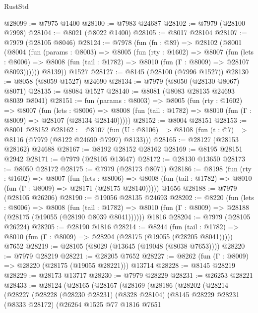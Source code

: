 \begin{lexlean}{RustStd}
\begin{coremodule}
@28099 := @7975 @1400
@28100 := @7983 @24687
@28102 := @7979 (@28100 @7998)
@28104 := @8021 (@8022 @1400)
@28105 := @8017 @28104
@28107 := @7979 (@28105 @8046)
@28124 := @7978
    (fun (fn : @89) =>
    @28102
      (@8001
        (@8004
          (fun (params : @8003) =>
          @8005
            (fun (rty : @1602) =>
            @8007
              (fun (lets : @8006) =>
              @8008 (fun (tail : @1782) => @8010 (fun (Γ : @8009) => @28107 @8093))))))
        @8139))
    @1527
@28127 := @8145 (@28100 (@7996 @1527))
@28130 := @8058 (@8059 @1527) @24690
@28134 := @7979 (@8050 (@28130 @8067) @8071)
@28135 := @8084 @1527
@28140 := @8081 (@8083 @28135 @24693 @8039 @8041)
@28151 := fun (params : @8003) =>
  @8005
    (fun (rty : @1602) =>
    @8007
      (fun (lets : @8006) =>
      @8008 (fun (tail : @1782) => @8010 (fun (Γ : @8009) => @28107 (@28134 @28140)))))
@28152 := @8004 @28151
@28153 := @8001 @28152
@28162 := @8107
    (fun (U : @8106) => @8108 (fun (t : @7) => @8116 (@7979 (@8122 @24690 @7997) @8133)))
@28165 := @28127 (@28153 @28162) @24688
@28167 := @8192 @28152 @28162
@28169 := @8195 @28151 @2942
@28171 := @7979 (@28105 @13647)
@28172 := @28130 @13650
@28173 := @8050 @28172
@28175 := @7979 (@28173 @8071)
@28186 := @8198
    (fun (rty : @1602) =>
    @8007
      (fun (lets : @8006) =>
      @8008 (fun (tail : @1782) => @8010 (fun (Γ : @8009) => @28171 (@28175 @28140)))))
    @1656
@28188 := @7979 (@28105 @26206)
@28190 := @19056 @28135 @24693
@28202 := @8220
    (fun (lets : @8006) =>
    @8008
      (fun (tail : @1782) =>
      @8010 (fun (Γ : @8009) => @28188 (@28175 (@19055 (@28190 @8039 @8041))))))
    @1816
@28204 := @7979 (@28105 @26224)
@28205 := @28190 @1816
@28214 := @8244
    (fun (tail : @1782) => @8010 (fun (Γ : @8009) => @28204 (@28175 (@19055 (@28205 @8041)))))
    @7652
@28219 := @28105 (@8029 (@13645 (@19048 (@8038 @7653))))
@28220 := @7979 @28219
@28221 := @28205 @7652
@28227 := @8262 (fun (Γ : @8009) => @28220 (@28175 (@19055 @28221))) @13714
@28228 := @8145 @28219
@28229 := @28173 @13717
@28230 := @7979 @28229
@28231 := @26253 @28221
@28433 := @28124
    (@28165
      (@28167
        (@28169
          (@28186
            (@28202
              (@28214
                (@28227
                  (@28228
                    (@28230 @28231)
                    (@8328 @28104)
                    (@8145
                      @28229
                      @28231
                      (@8333 @28172)
                      (@26264
                        @1525
                        @77
                        @1816
                        @7651

\end{coremodule}
\end{lexlean}
